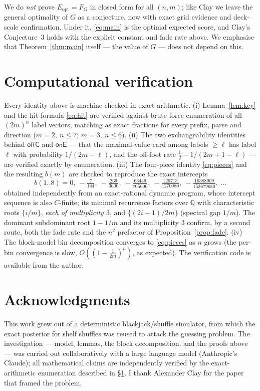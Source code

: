 \documentclass[11pt]{article}
\theoremstyle{definition}
\newcommand{\eopt}{E_{\mathrm{opt}}}
\newcommand{\Fg}{F_G}
\newcommand{\bigoh}{O}
\begin{document}
We do \emph{not} prove $\eopt=\Fg$ in closed form for all $(n,m)$; like Clay we leave the
general optimality of $G$ as a conjecture, now with exact grid evidence and deck-scale
confirmation. Under it, \eqref{eq:main} is the optimal expected score, and Clay's
Conjecture~3 holds with the explicit constant and fade rate above. We emphasise that
Theorem~\ref{thm:main} itself --- the value of $G$ --- does not depend on this.

\section{Computational verification}\label{sec:verify}

Every identity above is machine-checked in exact arithmetic. (i) Lemma~\ref{lem:key} and the
hit formula \eqref{eq:hit} are verified against brute-force enumeration of all $(2m)^n$ label
vectors, matching as exact fractions for every prefix, parse and direction ($m=2,\ n\le7$;
$m=3,\ n\le6$). (ii) The two exchangeability identities behind $\mathsf{offC}$ and
$\mathsf{onE}$ --- that the maximal-value card among labels $\ge\ell$ has label $\ell$ with
probability $1/(2m-\ell)$, and the off-foot rate $\tfrac12-1/(2m+1-\ell)$ --- are verified
exactly by enumeration. (iii) The four-piece identity \eqref{eq:pieces} and the resulting
$b(m)$ are checked to reproduce the exact intercepts
\[
  b(1..8)=0,\ -\tfrac{7}{144},\ -\tfrac{269}{3600},\ -\tfrac{63449}{705600},\ -\tfrac{126713}{1270080},\ -\tfrac{16388909}{153679680},\ \dots
\]
obtained independently from an exact-rational dynamic program, whose intercept sequence is also
$C$-finite; its minimal recurrence factors over $\mathbb{Q}$ with characteristic roots
$\{i/m\}$, \emph{each of multiplicity $3$}, and $\{(2i-1)/2m\}$ (spectral gap $1/m$). The
dominant subdominant root $1-1/m$ and its multiplicity $3$ confirm, by a second route, both the
fade rate and the $n^2$ prefactor of Proposition~\ref{prop:fade}. (iv) The block-model bin
decomposition
converges to \eqref{eq:pieces} as $n$ grows (the per-bin convergence is slow,
$\bigoh((1-\tfrac1{2m})^n)$, as expected). The verification code is available from the author.

\section*{Acknowledgments}

This work grew out of a deterministic blackjack/shuffle simulator, from which the exact
posterior for shelf shuffles was reused to attack the guessing problem. The investigation ---
model, lemmas, the block decomposition, and the proofs above --- was carried out
collaboratively with a large language model (Anthropic's Claude); all mathematical claims are
independently verified by the exact-arithmetic enumeration described in \S\ref{sec:verify}. I
thank Alexander Clay for the paper that framed the problem.
\end{document}

